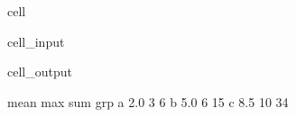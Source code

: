 \documentclass[letterpaper,10pt,english]{jupyterBook}
\begin{document}
\begin{sphinxuseclass}{cell}\begin{sphinxVerbatimInput}

\begin{sphinxuseclass}{cell_input}
\begin{sphinxVerbatim}[commandchars=\\\{\}]
\PYG{p}{[}\PYG{p}{]}\PYG{p}{[}\PYG{p}{]}
\end{sphinxVerbatim}

\end{sphinxuseclass}\end{sphinxVerbatimInput}
\begin{sphinxVerbatimOutput}

\begin{sphinxuseclass}{cell_output}
\begin{sphinxVerbatim}[commandchars=\\\{\}]
     mean  max  sum
grp                
a     2.0    3    6
b     5.0    6   15
c     8.5   10   34
\end{sphinxVerbatim}

\end{sphinxuseclass}\end{sphinxVerbatimOutput}

\end{sphinxuseclass}
\end{document}
